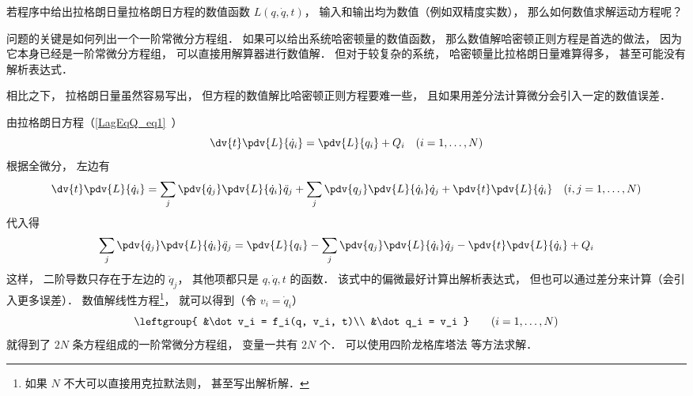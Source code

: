
\begin{issues}
\issueDraft
\end{issues}


若程序中给出拉格朗日量拉格朗日方程的数值函数 $L(q, \dot q, t)$， 输入和输出均为数值（例如双精度实数）， 那么如何数值求解运动方程呢？

问题的关键是如何列出一个一阶常微分方程组． 如果可以给出系统哈密顿量的数值函数， 那么数值解哈密顿正则方程是首选的做法， 因为它本身已经是一阶常微分方程组， 可以直接用解算器进行数值解． 但对于较复杂的系统， 哈密顿量比拉格朗日量难算得多， 甚至可能没有解析表达式．

相比之下， 拉格朗日量虽然容易写出， 但方程的数值解比哈密顿正则方程要难一些， 且如果用差分法计算微分会引入一定的数值误差．

由拉格朗日方程（\autoref{LagEqQ_eq1}~）
\begin{equation}
\dv{t} \pdv{L}{\dot q_i} = \pdv{L}{q_i} + Q_i
\quad (i=1,\dots,N)
\end{equation}
根据全微分， 左边有
\begin{equation}
\dv{t} \pdv{L}{\dot q_i} = \sum_j\pdv{\dot q_j}\pdv{L}{\dot q_i}\ddot q_j + \sum_j\pdv{q_j}\pdv{L}{\dot q_i}\dot q_j + \pdv{t}\pdv{L}{\dot q_i} \quad (i,j=1,\dots,N)
\end{equation}
代入得
\begin{equation}
\sum_j\pdv{\dot q_j}\pdv{L}{\dot q_i}\ddot q_j = \pdv{L}{q_i} - \sum_j\pdv{q_j}\pdv{L}{\dot q_i}\dot q_j - \pdv{t}\pdv{L}{\dot q_i} + Q_i
\end{equation}
这样， 二阶导数只存在于左边的 $\ddot q_j$， 其他项都只是 $q,\dot q, t$ 的函数． 该式中的偏微最好计算出解析表达式， 但也可以通过差分来计算（会引入更多误差）． 数值解线性方程\footnote{如果 $N$ 不大可以直接用克拉默法则， 甚至写出解析解．}， 就可以得到（令 $v_i = \dot q_i$）
\begin{equation}
\leftgroup{
&\dot v_i = f_i(q, v_i, t)\\
&\dot q_i = v_i
}\qquad (i = 1,\dots,N)
\end{equation}
就得到了 $2N$ 条方程组成的一阶常微分方程组， 变量一共有 $2N$ 个． 可以使用四阶龙格库塔法 等方法求解．

